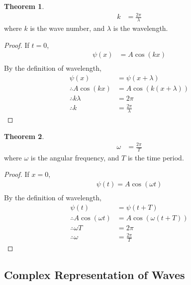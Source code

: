 \documentclass[fleqn, a4paper, 12pt, twoside]{article}
\theoremstyle{definition}
\theoremstyle{theorem}
\newtheorem{theorem}{Theorem}
\begin{document}
\begin{theorem}
	\begin{align*}
		k & = \frac{2 \pi}{\lambda}
	\end{align*}
	where $k$ is the wave number, and $\lambda$ is the wavelength.
\end{theorem}

\begin{proof}
	If $t = 0$,
	\begin{align*}
		\psi(x) & = A \cos(k x) \\
	\end{align*}
	By the definition of wavelength,
	\begin{align*}
		\psi(x)                & = \psi(x + \lambda)                    \\
		\therefore A \cos(k x) & = A \cos\left( k (x + \lambda) \right) \\
		\therefore k \lambda   & = 2 \pi                                \\
		\therefore k           & = \frac{2 \pi}{\lambda}
	\end{align*}
\end{proof}

\begin{theorem}
	\begin{align*}
		\omega & = \frac{2 \pi}{T}
	\end{align*}
	where $\omega$ is the angular frequency, and $T$ is the time period.
\end{theorem}

\begin{proof}
	If $x = 0$,
	\begin{align*}
		\psi(t) = A \cos(\omega t) \\
	\end{align*}
	By the definition of wavelength,
	\begin{align*}
		\psi(t)                     & = \psi(t + T)                         \\
		\therefore A \cos(\omega t) & = A \cos\left( \omega (t + T) \right) \\
		\therefore \omega T         & = 2 \pi                               \\
		\therefore \omega           & = \frac{2 \pi}{T}
	\end{align*}
\end{proof}

\subsection{Complex Representation of Waves}
\end{document}
